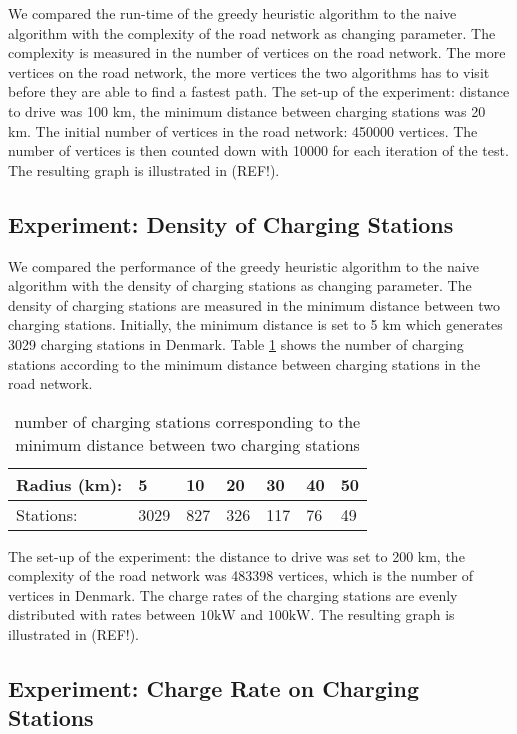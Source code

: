 We compared the run-time of the greedy heuristic algorithm to the naive algorithm with the complexity of the road network as changing parameter. The
complexity is measured in the number of vertices on the road network. The more vertices on the road network, the more vertices the two algorithms has 
to visit before they are able to find a fastest path. The set-up of the experiment: distance to drive was 100 km, the minimum distance between 
charging stations was 20 km. The initial number of vertices in the road network: 450000 vertices. The number of vertices is then counted down with 10000 for each iteration of the test. The resulting graph is illustrated in (REF!).

\subsection{Experiment: Density of Charging Stations}

We compared the performance of the greedy heuristic algorithm to the naive algorithm with the density of charging stations as changing parameter. The
density of charging stations are measured in the minimum distance between two charging stations. Initially, the minimum distance is set to 5 km which generates 3029 charging stations in Denmark. Table \ref{table:chargedensity} shows the number of charging stations according to the minimum distance between charging stations in the road network.

\begin{table}[!htb]
\centering
		\begin{tabular}{ p{1.85cm} p{0.67cm} p{0.63cm} p{0.63cm} p{0.63cm} p{0.63cm} p{0.63cm} } \hline
		Radius (km): & 5 & 10 & 20 & 30 & 40 & 50 \\ \hline
		Stations: & 3029 & 827 & 326 & 117 & 76 & 49 \\ \hline 
		\end{tabular}
		\caption{number of charging stations corresponding to the minimum distance between two charging stations}
	\label{table:chargedensity}
	\end{table}

The set-up of the experiment: the distance to drive was set to 200 km, the complexity of the road network was 483398 vertices, which is the number of vertices in Denmark. The charge rates of the charging stations are evenly distributed with rates between $10 \si{\kW}$ and $100 \si{\kW}$. The resulting graph is illustrated in (REF!).

\subsection{Experiment: Charge Rate on Charging Stations}

